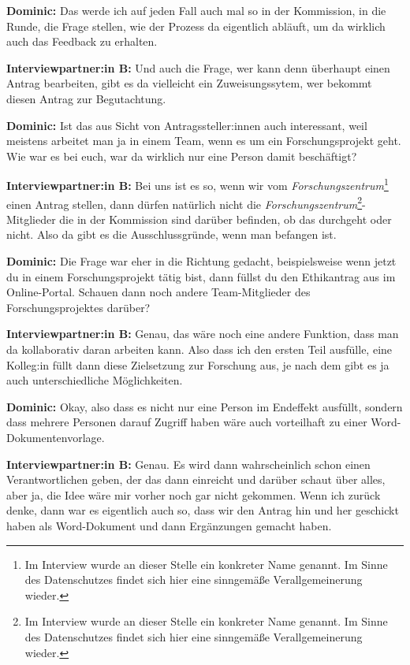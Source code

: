 \documentclass[a4paper,12pt,twoside]{scrreprt}
\begin{document}
\textbf{Dominic:} Das werde ich auf jeden Fall auch mal so in der Kommission, in die Runde, die Frage stellen, wie der Prozess da eigentlich abläuft, um da wirklich auch das Feedback zu erhalten.

\textbf{Interviewpartner:in B:} Und auch die Frage, wer kann denn überhaupt einen Antrag bearbeiten, gibt es da vielleicht ein Zuweisungssytem, wer bekommt diesen Antrag zur Begutachtung.

\textbf{Dominic:} Ist das aus Sicht von Antragssteller:innen auch interessant, weil meistens arbeitet man ja in einem Team, wenn es um ein Forschungsprojekt geht. Wie war es bei euch, war da wirklich nur eine Person damit beschäftigt?

\textbf{Interviewpartner:in B:} Bei uns ist es so, wenn wir vom \textit{Forschungszentrum}\footnote{Im Interview wurde an dieser Stelle ein konkreter Name genannt. Im Sinne des Datenschutzes findet sich hier eine sinngemäße Verallgemeinerung wieder.} einen Antrag stellen, dann dürfen natürlich nicht die \textit{Forschungszentrum}\footnote{Im Interview wurde an dieser Stelle ein konkreter Name genannt. Im Sinne des Datenschutzes findet sich hier eine sinngemäße Verallgemeinerung wieder.}-Mitglieder die in der Kommission sind darüber befinden, ob das durchgeht oder nicht. Also da gibt es die Ausschlussgründe, wenn man befangen ist.

\textbf{Dominic:} Die Frage war eher in die Richtung gedacht, beispielsweise wenn jetzt du in einem Forschungsprojekt tätig bist, dann füllst du den Ethikantrag aus im Online-Portal. Schauen dann noch andere Team-Mitglieder des Forschungsprojektes darüber?

\textbf{Interviewpartner:in B:} Genau, das wäre noch eine andere Funktion, dass man da kollaborativ daran arbeiten kann. Also dass ich den ersten Teil ausfülle, eine Kolleg:in füllt dann diese Zielsetzung zur Forschung aus, je nach dem gibt es ja auch unterschiedliche Möglichkeiten.

\textbf{Dominic:} Okay, also dass es nicht nur eine Person im Endeffekt ausfüllt, sondern dass mehrere Personen darauf Zugriff haben wäre auch vorteilhaft zu einer Word-Dokumentenvorlage.

\textbf{Interviewpartner:in B:} Genau. Es wird dann wahrscheinlich schon einen Verantwortlichen geben, der das dann einreicht und darüber schaut über alles, aber ja, die Idee wäre mir vorher noch gar nicht gekommen. Wenn ich zurück denke, dann war es eigentlich auch so, dass wir den Antrag hin und her geschickt haben als Word-Dokument und dann Ergänzungen gemacht haben.
\end{document}

